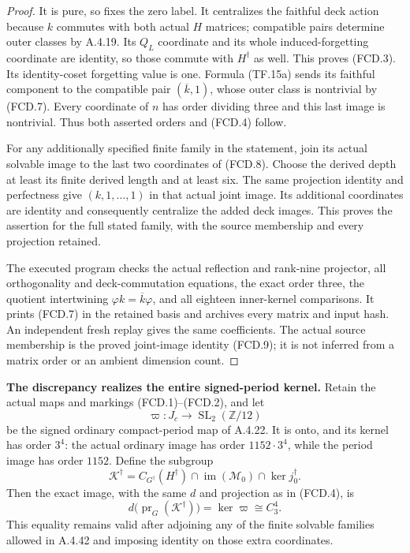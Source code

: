 \begin{proof}
It is pure, so fixes the zero label.  It centralizes
the faithful deck action because $k$ commutes with
both actual $H$ matrices; compatible pairs determine
outer classes by A.4.19.  Its $Q_L$ coordinate and
its whole induced-forgetting coordinate are identity,
so those commute with $H^\dagger$ as well.  This proves
(FCD.3).  Its identity-coset forgetting value is one.
Formula (TF.15a) sends its faithful component to the
compatible pair $(\overline k,1)$, whose outer class
is nontrivial by (FCD.7).  Every coordinate of $n$
has order dividing three and this last image is
nontrivial.  Thus both asserted orders and (FCD.4)
follow.

For any additionally specified finite family in the
statement, join its actual solvable image to the last
two coordinates of (FCD.8).  Choose the derived depth
at least its finite derived length and at least six.
The same projection identity and perfectness give
$(k,1,\ldots,1)$ in that actual joint image.  Its
additional coordinates are identity and consequently
centralize the added deck images.  This proves the
assertion for the full stated family, with the source
membership and every projection retained.

The executed program
checks the actual reflection and rank-nine projector,
all orthogonality and deck-commutation equations,
the exact order three, the quotient intertwining
$\varphi k=\overline k\varphi$, and all eighteen
inner-kernel comparisons.  It prints (FCD.7) in the
retained basis and archives every matrix and input
hash.  An independent fresh replay gives the same
coefficients.  The actual source membership is the
proved joint-image identity (FCD.9); it is not inferred
from a matrix order or an ambient dimension count.
\end{proof}

\par\medskip\noindent\textbf{The discrepancy realizes the entire signed-period kernel.}\quad
Retain the actual maps and markings (FCD.1)--(FCD.2), and let
\[
 \varpi:J_c\longrightarrow\operatorname{SL}_2(\mathbb Z/12)
 \tag{CDF.1}
\]
be the signed ordinary compact-period map of A.4.22.
It is onto, and its kernel has order $3^4$: the actual
ordinary image has order $1152\cdot3^4$, while the
period image has order $1152$.
Define the subgroup
\[
 \mathcal K^\dagger=
 C_{G^\dagger}(H^\dagger)\cap
 \operatorname{im}(\mathcal M_0)\cap\ker j_0^\dagger.
 \tag{CDF.2}
\]
Then the exact image, with the same $d$ and projection as
in (FCD.4), is
\[
 d\bigl(\operatorname{pr}_G(\mathcal K^\dagger)\bigr)
       =\ker\varpi\cong C_3^4.
 \tag{CDF.3}
\]
This equality remains valid after adjoining any of the
finite solvable families allowed in A.4.42 and imposing
identity on those extra coordinates.

